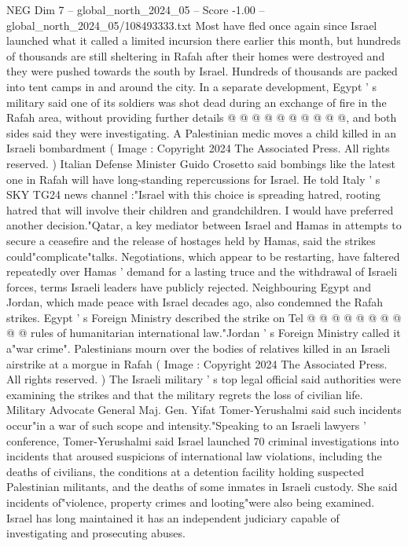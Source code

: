\begin{textsample}{NEG Dim 7 – global\_north\_2024\_05 – Score -1.00 – global\_north\_2024\_05/108493333.txt}
Most have fled once again since Israel launched what it called a limited incursion there earlier this month, but hundreds of thousands are still sheltering in Rafah after their homes were destroyed and they were pushed towards the south by Israel.
Hundreds of thousands are packed into tent camps in and around the city.
In a separate development, Egypt ' s military said one of its soldiers was shot dead during an exchange of fire in the Rafah area, without providing further details @ @ @ @ @ @ @ @ @ @, and both sides said they were investigating.
A Palestinian medic moves a child killed in an Israeli bombardment ( Image : Copyright 2024 The Associated Press.
All rights reserved. ) Italian Defense Minister Guido Crosetto said bombings like the latest one in Rafah will have long-standing repercussions for Israel.
He told Italy ' s SKY TG24 news channel :"Israel with this choice is spreading hatred, rooting hatred that will involve their children and grandchildren.
I would have preferred another decision."Qatar, a key mediator between Israel and Hamas in attempts to secure a ceasefire and the release of hostages held by Hamas, said the strikes could"complicate"talks.
Negotiations, which appear to be restarting, have faltered repeatedly over Hamas ' demand for a lasting truce and the withdrawal of Israeli forces, terms Israeli leaders have publicly rejected.
Neighbouring Egypt and Jordan, which made peace with Israel decades ago, also condemned the Rafah strikes.
Egypt ' s Foreign Ministry described the strike on Tel @ @ @ @ @ @ @ @ @ @ rules of humanitarian international law."Jordan ' s Foreign Ministry called it a"war crime".
Palestinians mourn over the bodies of relatives killed in an Israeli airstrike at a morgue in Rafah ( Image : Copyright 2024 The Associated Press.
All rights reserved. ) The Israeli military ' s top legal official said authorities were examining the strikes and that the military regrets the loss of civilian life.
Military Advocate General Maj.
Gen.
Yifat Tomer-Yerushalmi said such incidents occur"in a war of such scope and intensity."Speaking to an Israeli lawyers ' conference, Tomer-Yerushalmi said Israel launched 70 criminal investigations into incidents that aroused suspicions of international law violations, including the deaths of civilians, the conditions at a detention facility holding suspected Palestinian militants, and the deaths of some inmates in Israeli custody.
She said incidents of"violence, property crimes and looting"were also being examined.
Israel has long maintained it has an independent judiciary capable of investigating and prosecuting abuses.

\end{textsample}
